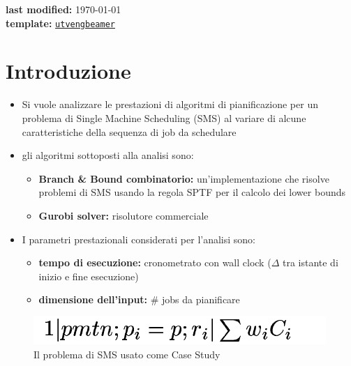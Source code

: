 \documentclass[compress]{beamer}
\begin{document}
    
\begin{frame}[plain]
    \titlepage
    \textbf{last modified:} \today \space \currenttime \\
    \textbf{template:} \href{https://github.com/IntelligentSystemsLabUTV/UTV-Eng-beamer-template}{\texttt{utvengbeamer}}
\end{frame}

\section{Introduzione}
    \begin{frame}{\secname}
        \begin{itemize}
            \item Si vuole analizzare le prestazioni di algoritmi di pianificazione
             per un problema di Single Machine Scheduling (SMS) al variare 
             di alcune caratteristiche della sequenza di job da schedulare
             \item gli algoritmi sottoposti alla analisi sono: 
             \begin{itemize}
                \item \textbf{Branch \& Bound combinatorio:} un'implementazione che risolve
                problemi di SMS usando la regola SPTF per il calcolo dei lower bounds 
                \item \textbf{Gurobi solver:} risolutore commerciale 
             \end{itemize}
             \item I parametri prestazionali considerati per l'analisi sono:
             \begin{itemize}
                \item \textbf {tempo di esecuzione:} cronometrato con wall clock ($\Delta$ tra istante di inizio e fine esecuzione)
                \item \textbf {dimensione dell'input:} \# jobs da pianificare
            \end{itemize} 
        \end{itemize}
        \vfill
        \begin{figure}
            \includegraphics[scale=0.5]{figs/objective.png}
            \caption{Il problema di SMS usato come Case Study}
        \end{figure}
    \end{frame}
\end{document}
